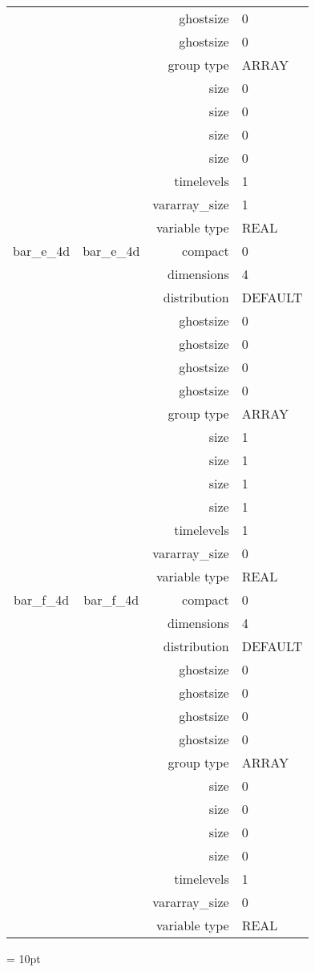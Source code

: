 \begin{tabular*}{150mm}{|c|c@{\extracolsep{\fill}}|rl|}
 &  & ghostsize & 0 \\ 
 &  & ghostsize & 0 \\ 
 &  & group type & ARRAY \\ 
 &  & size & 0 \\ 
& ~ & size & 0 \\ 
 &  & size & 0 \\ 
 &  & size & 0 \\ 
 &  & timelevels & 1 \\ 
 &  & vararray\_size & 1 \\ 
 &  & variable type & REAL \\ 
\hline 
bar\_e\_4d & bar\_e\_4d & compact & 0 \\ 
 &  & dimensions & 4 \\ 
 &  & distribution & DEFAULT \\ 
 &  & ghostsize & 0 \\ 
& ~ & ghostsize & 0 \\ 
 &  & ghostsize & 0 \\ 
 &  & ghostsize & 0 \\ 
 &  & group type & ARRAY \\ 
 &  & size & 1 \\ 
& ~ & size & 1 \\ 
 &  & size & 1 \\ 
 &  & size & 1 \\ 
 &  & timelevels & 1 \\ 
 &  & vararray\_size & 0 \\ 
 &  & variable type & REAL \\ 
\hline 
bar\_f\_4d & bar\_f\_4d & compact & 0 \\ 
 &  & dimensions & 4 \\ 
 &  & distribution & DEFAULT \\ 
 &  & ghostsize & 0 \\ 
& ~ & ghostsize & 0 \\ 
 &  & ghostsize & 0 \\ 
 &  & ghostsize & 0 \\ 
 &  & group type & ARRAY \\ 
 &  & size & 0 \\ 
& ~ & size & 0 \\ 
 &  & size & 0 \\ 
 &  & size & 0 \\ 
 &  & timelevels & 1 \\ 
 &  & vararray\_size & 0 \\ 
 &  & variable type & REAL \\ 
\hline 
\end{tabular*} 



\vspace{5mm}\parskip = 10pt 
